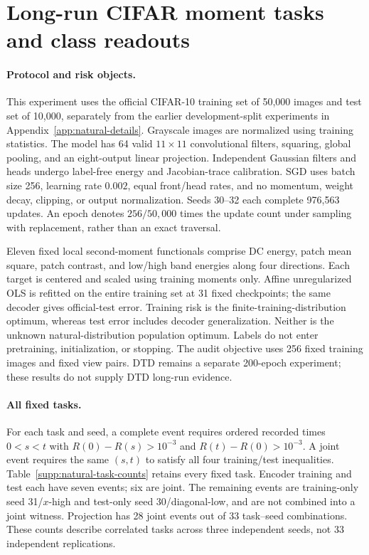 \section{Long-run CIFAR moment tasks and class readouts}
\label{supp:natural-long}
\paragraph{Protocol and risk objects.}
This experiment uses the official CIFAR-10 training set of 50,000 images and test set of 10,000, separately from the earlier development-split experiments in Appendix~\ref{app:natural-details}. Grayscale images are normalized using training statistics. The model has 64 valid $11\times11$ convolutional filters, squaring, global pooling, and an eight-output linear projection. Independent Gaussian filters and heads undergo label-free energy and Jacobian-trace calibration. SGD uses batch size 256, learning rate $0.002$, equal front/head rates, and no momentum, weight decay, clipping, or output normalization. Seeds 30--32 each complete 976,563 updates. An epoch denotes $256/50{,}000$ times the update count under sampling with replacement, rather than an exact traversal.

Eleven fixed local second-moment functionals comprise DC energy, patch mean square, patch contrast, and low/high band energies along four directions. Each target is centered and scaled using training moments only. Affine unregularized OLS is refitted on the entire training set at 31 fixed checkpoints; the same decoder gives official-test error. Training risk is the finite-training-distribution optimum, whereas test error includes decoder generalization. Neither is the unknown natural-distribution population optimum. Labels do not enter pretraining, initialization, or stopping. The audit objective uses 256 fixed training images and fixed view pairs. DTD remains a separate 200-epoch experiment; these results do not supply DTD long-run evidence.

\paragraph{All fixed tasks.}
For each task and seed, a complete event requires ordered recorded times $0<s<t$ with $R(0)-R(s)>10^{-3}$ and $R(t)-R(0)>10^{-3}$. A joint event requires the same $(s,t)$ to satisfy all four training/test inequalities. Table~\ref{supp:natural-task-counts} retains every fixed task. Encoder training and test each have seven events; six are joint. The remaining events are training-only seed 31/$x$-high and test-only seed 30/diagonal-low, and are not combined into a joint witness. Projection has 28 joint events out of 33 task--seed combinations. These counts describe correlated tasks across three independent seeds, not 33 independent replications.

